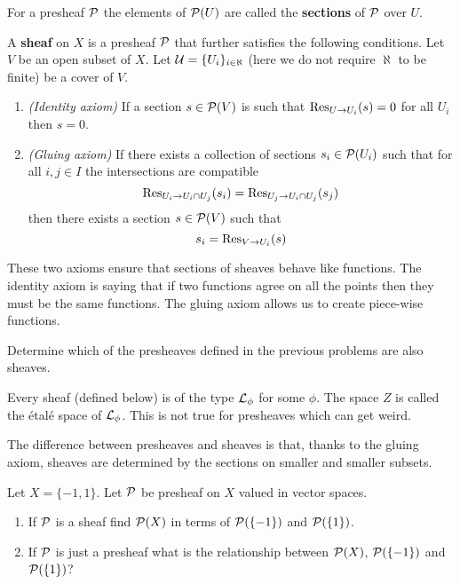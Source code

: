 \begin{definition}
	For a presheaf $\P$ the elements of $\P(U)$ are called the \textbf{sections} of $\P$ over $U$.
\end{definition}
\begin{definition}
	A \textbf{sheaf} on $ X$ is a presheaf $ \P$ that further satisfies the following conditions. Let $V$ be an open subset of $X$. Let $ \U = \{U_i\}_{i \in \aleph}$ (here we do not require $\aleph$ to be finite) be a cover of $ V$.
	\begin{enumerate}
		\item \textit{(Identity axiom)} If a section $s \in \P(V)$ is such that $ \mor_{U \rightarrow U_i}(s) = 0$ for all $ U_i$ then $ s = 0$.
		\item \textit{(Gluing axiom)} If there exists a collection of sections $ s_i \in \P(U_i)$ such that for all $ i,j \in I$ the intersections are compatible $$ \mor_{U_i \rightarrow U_i \cap U_j} (s_i) = \mor_{U_j \rightarrow U_i \cap U_j} (s_j)$$ then there exists a section $ s \in \P(V)$ such that $$ s_i = \mor_{V \rightarrow U_i} (s) $$
	\end{enumerate}
\end{definition}
These two axioms ensure that sections of sheaves behave like functions. The identity axiom is saying that if two functions agree on all the points then they must be the same functions. The gluing axiom allows us to create piece-wise functions.
%

\begin{ques}
	Determine which of the presheaves defined in the previous problems are also sheaves.
\end{ques}
\begin{remark}
	Every sheaf (defined below) is of the type $\L_\phi$ for some $\phi$. The space $Z$ is called the \'etal\'e space of $\L_\phi$. This is not true for presheaves which can get weird.
\end{remark}

The difference between presheaves and sheaves is that, thanks to the gluing axiom, sheaves are determined by the sections on smaller and smaller subsets.
\begin{ques}
	Let $X = \{-1 , 1\}$. Let $\P$ be presheaf on $X$ valued in vector spaces.
	\begin{enumerate}
		\item If $\P$ is a sheaf find $\P(X)$ in terms of $\P(\{-1\})$ and $\P(\{1\})$.
		\item If $\P$ is just a presheaf what is the relationship between $\P(X)$, $\P(\{-1\})$ and $\P(\{1\})$?
	\end{enumerate}
\end{ques}

